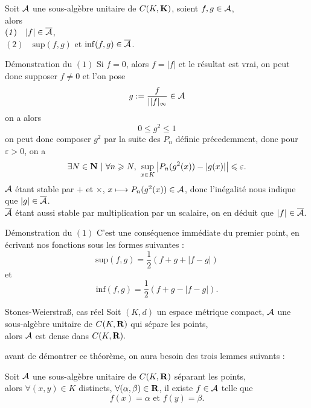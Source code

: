 \documentclass[a4paper,11pt, twoside]{article}
\begin{document}
\begin{prop}
  Soit $\mathcal A$ une sous-algèbre unitaire de $C(K,\mathbf K)$, soient $f,g\in\mathcal A$,\\
  
  alors\\
  $(\mathit 1)\quad |f|\in\overline{\mathcal A}$,\\[1em]
  $(\mathit 2)\quad \mathrm{sup}(f,g)$ et $\mathrm{inf}(f,g)\in\overline{\mathcal A}$.
\end{prop}


\begin{ProofC}{Démonstration du $(\mathit1)$}
  Si $f=0$, alors $f=|f|$ et le résultat est vrai, on peut donc supposer $f\neq 0$ et l'on pose 
  $$g:=\frac{f}{||f|_{\infty}}\in\mathcal A$$
  on a alors 
  $$0\leqslant g^2\leqslant 1$$
  on peut donc composer $g^2$ par la suite des $P_n$ définie précedemment, donc pour $\varepsilon>0$, on a 
  $$\exists N\in\mathbf N\ |\ \forall n\geqslant N,\ \underset{x\in K}{\mathrm{sup}}\left|P_n(g^2(x))-|g(x)|\right|\leqslant\varepsilon.$$
  $\mathcal A$ étant stable par $+$ et $\times$, $x\longmapsto P_n(g^2(x))\in\mathcal A$, donc l'inégalité nous indique que $|g|\in\overline{\mathcal A}$.\\
  $\overline{\mathcal A}$ étant aussi stable par multiplication par un scalaire, on en déduit que $|f|\in\overline{\mathcal A}$.
\end{ProofC}


\begin{ProofC}{Démonstration du $(\mathit1)$}
  C'est une conséquence immédiate du premier point, en écrivant nos fonctions sous les formes suivantes : 
  $$\mathrm{sup}(f,g)=\frac12\left(f+g+|f-g|\right)$$
  et
  $$\mathrm{inf}(f,g)=\frac12\left(f+g-|f-g|\right).$$
\end{ProofC}


\begin{thC}{Stones-Weierstra\ss, cas réel}
  Soit $(K,d)$ un espace métrique compact, $\mathcal A$ une sous-algèbre unitaire de $C(K,\mathbf R)$ qui sépare les points,\\

  alors $\mathcal A$ est dense dans $C(K,\mathbf R).$
\end{thC}


avant de démontrer ce théorème, on aura besoin des trois lemmes suivants :


\begin{lemme}
  Soit $\mathcal A$ une sous-algèbre unitaire de $C(K,\mathbf R)$ séparant les points,\\

  alors $\forall (x,y)\in K$ distincts, $\forall (\alpha,\beta)\in\mathbf R$, il existe $f\in\mathcal A$ telle que 
  $$f(x)=\alpha\text{ et }f(y)=\beta.$$
\end{lemme}
\end{document}
